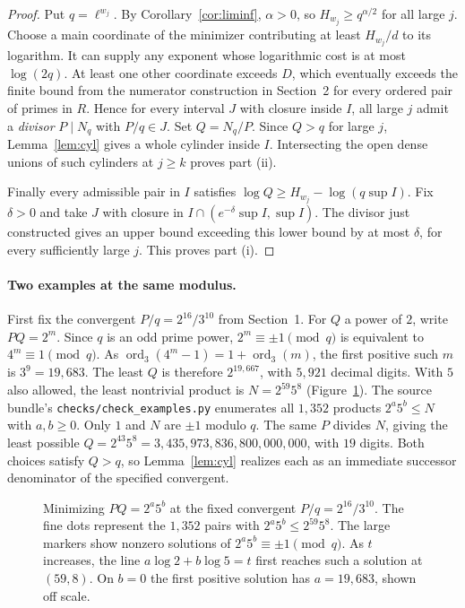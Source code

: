 \documentclass[11pt]{article}
\begin{document}
\begin{proof}
Put $q=\ell^{w_j}$. By Corollary~\ref{cor:liminf}, $\alpha>0$, so
$H_{w_j}\ge q^{\alpha/2}$ for all large $j$. Choose a main coordinate
of the minimizer contributing at least $H_{w_j}/d$ to its logarithm.
It can supply any exponent whose logarithmic cost is at most $\log(2q)$.
At least one other coordinate exceeds $D$, which eventually exceeds the
finite bound from the numerator construction in Section~2 for every
ordered pair of primes in $R$. Hence for every interval $J$
with closure inside $I$, all large $j$ admit a \emph{divisor}
$P\mid N_q$ with $P/q\in J$. Set $Q=N_q/P$. Since $Q>q$ for
large $j$, Lemma~\ref{lem:cyl} gives a whole cylinder inside $I$.
Intersecting the open dense unions of such cylinders at $j\ge k$ proves
part (ii).

Finally every admissible pair in $I$ satisfies
$\log Q\ge H_{w_j}-\log(q\sup I)$. Fix $\delta>0$ and take $J$ with
closure in $I\cap(e^{-\delta}\sup I,\sup I)$. The divisor just constructed
gives an upper bound exceeding this lower bound by at most $\delta$,
for every sufficiently large $j$. This proves part (i).
\end{proof}

\paragraph{Two examples at the same modulus.}
First fix the convergent $P/q=2^{16}/3^{10}$ from Section~1. For $Q$
a power of $2$, write $P Q=2^m$. Since $q$ is an odd prime power,
$2^m\equiv\pm1\pmod q$ is equivalent to $4^m\equiv1\pmod q$.
As $\operatorname{ord}_3(4^m-1)=1+\operatorname{ord}_3(m)$, the first
positive such $m$ is $3^9=19{,}683$. The least $Q$ is therefore
$2^{19{,}667}$, with $5{,}921$ decimal digits. With $5$ also allowed,
the least nontrivial product is $N=2^{59}5^8$ (Figure~\ref{fig:exponents}). The source bundle's
\texttt{checks/check\_examples.py} enumerates all $1{,}352$ products
$2^a5^b\le N$ with $a,b\ge0$. Only $1$ and $N$ are $\pm1$ modulo $q$.
The same $P$ divides $N$, giving the least possible
$Q=2^{43}5^8=3{,}435{,}973{,}836{,}800{,}000{,}000$, with $19$ digits.
Both choices satisfy $Q>q$, so Lemma~\ref{lem:cyl} realizes each as an
immediate successor denominator of the specified convergent.

\begin{figure}[!htb]
\centering
{}%
  {}
\caption{Minimizing $P Q=2^a5^b$ at the fixed convergent $P/q=2^{16}/3^{10}$.
The fine dots represent the $1{,}352$ pairs with $2^a5^b\le 2^{59}5^8$.
The large markers show nonzero solutions of $2^a5^b\equiv\pm1\pmod q$.
As $t$ increases, the line $a\log 2+b\log 5=t$ first reaches such a solution
at $(59,8)$. On $b=0$ the first positive solution has $a=19{,}683$, shown off scale.}
\label{fig:exponents}
\end{figure}
\end{document}

